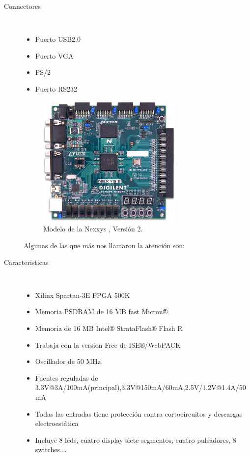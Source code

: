 \documentclass[paper=a4, fontsize=12pt]{article} 		%
\numberwithin{equation}{section}						%
\numberwithin{table}{section} 							%
\begin{document}
\begin{description}
  \item[Connectores] \hfill \\
  	\begin{itemize}
		\item Puerto USB2.0
	    \item Puerto VGA
		\item PS/2
	    \item Puerto RS232
    \end{itemize}
\begin{figure}[H]
 \centering
   \includegraphics[width=0.7\textwidth]{model}
 \caption{Modelo de la Nexxys , Versión 2.}
    \label{fig:modelo}
\end{figure}
Algunas de las que más nos llamaron la atención son:\\
  \item[Caracteristicas] \hfill \\
    	\begin{itemize}
			\item Xilinx Spartan-3E FPGA 500K
			\item Memoria PSDRAM de 16 MB fast Micron® 
			\item Memoria de 16 MB Intel® StrataFlash® Flash R 
      		\item Trabaja con la version Free de ISE®/WebPACK 
            \item Oscillador de 50 MHz
			\item Fuentes reguladas de 3.3V@3A/100mA(principal),3.3V@150mA/60mA,2.5V/1.2V@1.4A/50mA
            \item Todas las entradas tiene protección contra cortocircuitos y descargas electroestática
  			\item Incluye  8 leds, cuatro display siete segmentos, cuatro pulsadores, 8 switches.\ldots
      \end{itemize}
\end{description}
\end{document}
